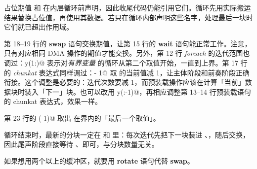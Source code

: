 占位期值 \co@lfB@ 和 \co@rfB@ 在内层循环前声明，因此收尾代码仍能引用它们。循环先用实际搬运结果替换占位值，再使用其数据。若只在循环内部声明这些名字，处理最后一块时它们就已超出作用域。

第 18--19 行的 \textbf{swap} 语句交换期值，让第 15 行的 \textbf{wait} 语句能正常工作。注意，只有对应相同 DMA 操作的期值才能交换。另外，第 12 行 \emph{foreach} 的迭代范围也调过：\co@foreach y(1:)@ 表示对\emph{有界变量} \co@y@ 的循环从第二个取值开始，一直到上界。第 17 行的 \emph{chunkat} 表达式同样调过：\co@y - 1@ 取 \co@y@ 的当前值减 1，让主体阶段和前奏阶段正确衔接。这个调整是必要的：迭代次数要减 1，而预装载操作应该在计算「当前」数据块时装入「下一」块。也可以改用 \co@foreach y(:-1)@，再相应调整第 13--14 行预装载语句的 chunkat 表达式，效果一样。

第 23 行的 \co@y(-1)@ 取出 \co@y@ 在界内的「最后一个取值」。

循环结束时，最新的分块一定在 \co@lfA@ 和 \co@rfA@ 里：每次迭代先把下一块装进 \co@lfB@、\co@rfB@，随后交换，因此尾声阶段直接等待 \co@lfA@、\co@rfA@ 即可，与分块数量无关。

如果想用两个以上的缓冲区，就要用 \textbf{rotate} 语句代替 \textbf{swap}。
